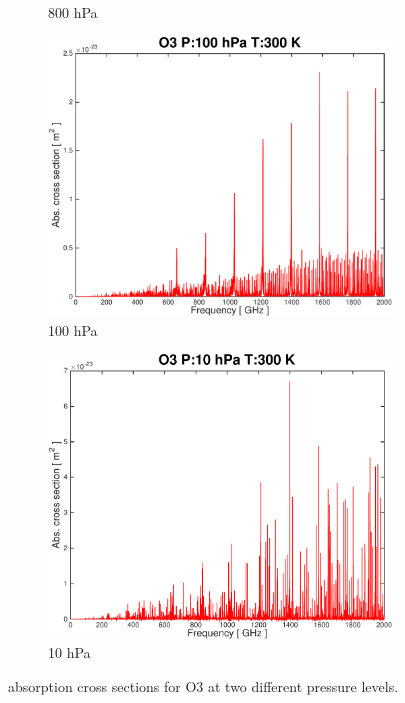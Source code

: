 \documentclass[paper=a4, fontsize=11pt]{scrartcl} %
\numberwithin{figure}{section}
\begin{document}
\begin{figure}[t!]
\begin{subfigure}[t]{0.45\textwidth}
 \caption{800 hPa}
 \end{subfigure}
 \begin{subfigure}[b]{0.45\textwidth}
 \includegraphics[width=\textwidth]{plots/plot_xsec_O3_100hPa_300K.pdf}
 \caption{100 hPa}
 \end{subfigure}
 \begin{subfigure}[b]{0.45\textwidth}
 \includegraphics[width=\textwidth]{plots/plot_xsec_O3_10hPa_300K.pdf}
 \caption{10 hPa}
 \end{subfigure}
 \caption{absorption cross sections for O3 at two different pressure levels.}
 \label{figure:abs_pressure}
\end{figure}
\end{document}

